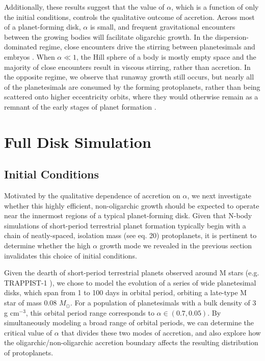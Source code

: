 Additionally, these results suggest that the value of $\alpha$, which is a function of only the initial conditions, controls the qualitative outcome of accretion. 
Across most of a planet-forming disk, $\alpha$ is small, and frequent gravitational encounters between the growing bodies will 
facilitate oligarchic growth. In the dispersion-dominated regime, close encounters drive the stirring between planetesimals and 
embryos \cite{weidenschilling89, ida90}. When $\alpha \ll 1$, the Hill sphere of a body is mostly empty space and the majority of close encounters result in viscous stirring, rather than accretion. In the opposite regime, we 
observe that runaway growth still occurs, but nearly all of the planetesimals are consumed by the forming protoplanets, rather 
than being scattered onto higher eccentricity orbits, where they would otherwise remain as a remnant of the early stages of 
planet formation \cite{kokubo98, kokubo00}.

\section{Full Disk Simulation}\label{sec:fulldisk}

\subsection{Initial Conditions}

Motivated by the qualitative dependence of accretion on $\alpha$,
we next investigate whether this highly efficient, non-oligarchic
growth should be expected to operate near the innermost regions of a typical planet-forming
disk. Given that N-body simulations of short-period terrestrial planet formation 
typically begin with a chain of neatly-spaced, isolation mass 
(see \cite{kokubo00} eq. 20) protoplanets, it is pertinent to determine 
whether the high $\alpha$ growth mode we revealed
in the previous section invalidates this choice of initial conditions.

Given the dearth of short-period terrestrial planets observed around M stars (e.g. TRAPPIST-1 \cite{gillon16, gillon17, agol21}), we chose to model the evolution of a series of wide planetesimal disks, which span from 1 to 100 days in orbital period, orbiting a late-type M star of mass 0.08 $M_{\odot}$. For a population of planetesimals with a bulk density of 3 g cm$^{-3}$, this orbital period range corresponds to $\alpha \in (0.7, 0.05)$. By simultaneously modeling a broad range of orbital periods, we can determine the critical value of $\alpha$ that divides these two modes of accretion, and also explore how the oligarchic/non-oligarchic accretion boundary affects the resulting distribution of protoplanets.


